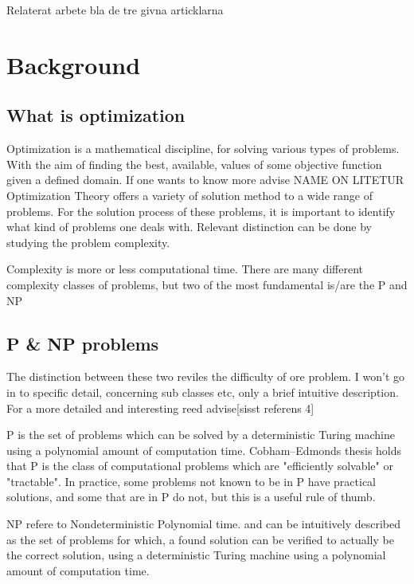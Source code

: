Relaterat arbete bla de tre givna articklarna 

\section{Background}

\subsection{What is optimization}

Optimization is a mathematical discipline, for solving various types of problems. With the aim of finding the best, available, values of some objective function given a defined domain. If one wants to know more advise NAME ON LITETUR\\

Optimization Theory offers a variety of solution method to a wide range of problems. For the solution process of these problems, it is important to identify what kind of problems one deals with.
Relevant distinction can be done by studying the problem complexity.

Complexity is more or less computational time. There are many different complexity classes of problems, but two of the most fundamental is/are the P and NP

\subsection{P \& NP problems}

The distinction between these two reviles the difficulty of ore problem. I won’t go in to specific detail, concerning sub classes etc, only a brief intuitive description.
For a more detailed and interesting reed advise[sisst referens 4]

P is the set of problems which can be solved by a deterministic Turing machine using a polynomial amount of computation time.
Cobham–Edmonds thesis holds that P is the class of computational problems which are "efficiently solvable" or "tractable". In practice, some problems not known to be in P have practical solutions, and some that are in P do not, but this is a useful rule of thumb.

NP refere to Nondeterministic Polynomial time. and can be intuitively described as the set of problems for which, a found solution can be verified to actually be the correct solution, using a deterministic Turing machine using a polynomial amount of computation time.


